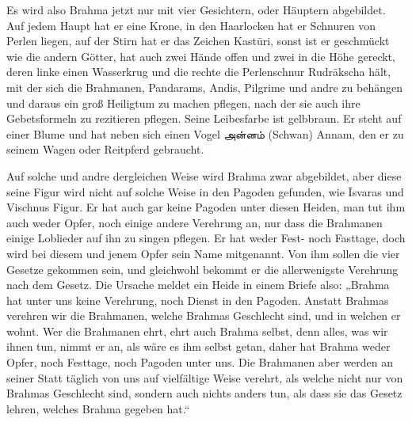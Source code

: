 \documentclass{article}
\newcommand{\TamilText}[1]{\texttamil{#1}}
\newcommand{\tam}[1]{\TamilText{#1}}
\begin{document}
Es wird also Brahma jetzt nur mit vier Gesichtern, oder Häuptern abgebildet. Auf jedem Haupt hat er eine Krone, in den Haarlocken hat er Schnuren von Perlen liegen, auf der Stirn hat er das Zeichen Kast\={u}ri, sonst ist er geschmückt wie die andern Götter, hat auch zwei Hände offen und zwei in die Höhe gereckt, deren linke einen Wasserkrug und die rechte die Perlenschnur Rudr\={a}kscha hält, mit der sich die Brahmanen, Pandarams, Andis, Pilgrime und andre zu behängen und daraus ein groß Heiligtum zu machen pflegen, nach der sie auch ihre Gebetsformeln zu rezitieren pflegen. Seine Leibesfarbe ist gelbbraun. Er steht auf einer Blume und hat neben sich einen Vogel \tam{அன்னம்} (Schwan) Annam, den er zu seinem Wagen oder Reitpferd gebraucht.

Auf solche und andre dergleichen Weise wird Brahma zwar abgebildet, aber diese seine Figur wird nicht auf solche Weise in den Pagoden gefunden, wie \={I}svaras und Vischnus Figur. Er hat auch gar keine Pagoden unter diesen Heiden, man tut ihm auch weder Opfer, noch einige andere Verehrung an, nur dass die Brahmanen einige Loblieder auf ihn zu singen pflegen. Er hat weder Fest- noch Fasttage, doch wird bei diesem und jenem Opfer sein Name mitgenannt. Von ihm sollen die vier Gesetze gekommen sein, und gleichwohl bekommt er die allerwenigste Verehrung nach dem Gesetz. Die Ursache meldet ein Heide in einem Briefe also: „Brahma hat unter uns keine Verehrung, noch Dienst in den Pagoden. Anstatt Brahmas verehren wir die Brahmanen, welche Brahmas Geschlecht sind, und in welchen er wohnt. Wer die Brahmanen ehrt, ehrt auch Brahma selbst, denn alles, was wir ihnen tun, nimmt er an, als wäre es ihm selbst getan, daher hat Brahma weder Opfer, noch Festtage, noch Pagoden unter uns. Die Brahmanen aber werden an seiner Statt täglich von uns auf vielfältige Weise verehrt, als welche nicht nur von Brahmas Geschlecht sind, sondern auch nichts anders tun, als dass sie das Gesetz lehren, welches Brahma gegeben hat.“
\end{document}
